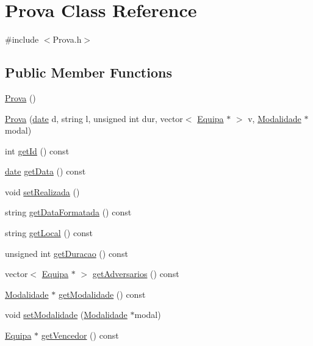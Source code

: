 \hypertarget{class_prova}{}\section{Prova Class Reference}
\label{class_prova}


{\ttfamily \#include $<$Prova.\+h$>$}

\subsection*{Public Member Functions}
\begin{DoxyCompactItemize}
\item 
\hyperlink{class_prova_a4f36eaf2032327c06f7f7accd1ff7359}{Prova} ()
\item 
\hyperlink{class_prova_a7e9ced519bd9e2e1d5580c6692d4b112}{Prova} (\hyperlink{structdate}{date} d, string l, unsigned int dur, vector$<$ \hyperlink{class_equipa}{Equipa} $\ast$ $>$ v, \hyperlink{class_modalidade}{Modalidade} $\ast$modal)
\item 
int \hyperlink{class_prova_af3038b49fc61aed526e480742becf27b}{get\+Id} () const 
\item 
\hyperlink{structdate}{date} \hyperlink{class_prova_a88e20574edda3295f8dca8a06028348b}{get\+Data} () const 
\item 
void \hyperlink{class_prova_a8c3ac362118b41554780bf7794d448f8}{set\+Realizada} ()
\item 
string \hyperlink{class_prova_ae170e53e9684644c4cfb5c864413a8b7}{get\+Data\+Formatada} () const 
\item 
string \hyperlink{class_prova_a032f33dd9c442edda490029fff463898}{get\+Local} () const 
\item 
unsigned int \hyperlink{class_prova_aea1d2198c70bb49385f716df2addf7ae}{get\+Duracao} () const 
\item 
vector$<$ \hyperlink{class_equipa}{Equipa} $\ast$ $>$ \hyperlink{class_prova_a015e691c4fa50bb756adced9cdc30eb7}{get\+Adversarios} () const 
\item 
\hyperlink{class_modalidade}{Modalidade} $\ast$ \hyperlink{class_prova_afbf918fbf8ddfd7a2b3785af51536e25}{get\+Modalidade} () const 
\item 
void \hyperlink{class_prova_a50060ead08c573c9ab96c92592907975}{set\+Modalidade} (\hyperlink{class_modalidade}{Modalidade} $\ast$modal)
\item 
\hyperlink{class_equipa}{Equipa} $\ast$ \hyperlink{class_prova_a64d0727625b43e4382e4806c032b2868}{get\+Vencedor} () const 
\item 

\end{DoxyCompactItemize}
